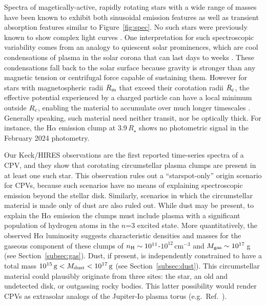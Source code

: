 \documentclass{nature3}
\begin{document}
Spectra of magetically-active, rapidly rotating stars with a wide range
of masses have been known to exhibit both sinusoidal emission features
\cite{Donati2000,Townsend2005,Dunstone2006,Skelly2008} as well as
transient absorption features
\cite{CollierCameron1989,CollierCameron1992,Cang2020} similar to
Figure~\ref{fig:spec}.  No such stars were previously known to show
complex light curves \cite{Bouma2024}.   One interpretation for
such spectroscopic variability comes from an analogy to quiescent solar
prominences, which are cool condensations of plasma in the solar corona
that can last days to weeks \cite{VialEngvold2015}.  These
condensations fall back to the solar surface because gravity is
stronger than any magnetic tension or centrifugal force capable of
sustaining them.  However for stars with magnetospheric radii $R_{\rm
m}$ that exceed their corotation radii $R_{\rm c}$, the effective
potential experienced by a charged particle can have a local minimum
outside $R_{\rm c}$, enabling the material to accumulate over much
longer timescales \cite{Petit2013,Daley-Yates2024}.  Generally
speaking, such material need neither transit, nor be optically thick.
For instance, the H$\alpha$ emission clump at 3.9\,$R_\star$ shows no 
photometric signal in the February 2024 photometry.

Our Keck/HIRES observations are the first reported time-series
spectra of a CPV, and they show that corotating circumstellar plasma clumps 
are present in at least one such star.
This
observation rules out a ``starspot-only'' origin scenario for CPVs,
\cite{Koen2021} because such scenarios have no means of explaining
spectroscopic emission beyond the stellar disk.  Similarly, scenarios in
which the circumstellar material is made only of dust are also ruled
out.  While dust may be present, to explain the H$\alpha$ emission the
clumps must include plasma with a significant population of hydrogen
atoms in the $n$=3 excited state.  
More quantitatively, the observed H$\alpha$ luminosity suggests
characteristic densities and masses for the gaseous component of these
clumps of $n_{\rm H} \sim 10^{11}$-$10^{12}$\,cm$^{-3}$ and $M_{\rm
gas} \sim 10^{17}$\,g (see Section~\ref{subsec:gas}).
Dust, if present, is independently constrained to have a total
mass $10^{15}\,{\rm g} < M_{\rm dust} < 10^{17}\,{\rm g}$ (see
Section~\ref{subsec:dust}).
This circumstellar material could plausibly originate from
three sites: the star, an old and undetected disk, or outgassing rocky
bodies.  This latter possibility would render CPVs as extrasolar analogs
of the Jupiter-Io plasma torus (e.g.~Ref.~\cite{Bagenal1981}).
\end{document}

